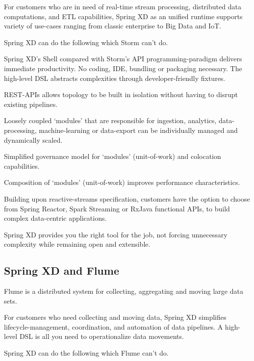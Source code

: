 For customers who are in need of real-time stream processing, distributed data computations, and ETL capabilities, Spring XD as an unified runtime supports variety of use-cases ranging from classic enterprise to Big Data and IoT. 

Spring XD can do the following which Storm can't do.

\begin{itemize*}
\item Spring XD's Shell compared with Storm's API programming-paradigm delivers immediate productivity. No coding, IDE, bundling or packaging necessary. The high-level DSL abstracts complexities through developer-friendly fixtures.
\item REST-APIs allows topology to be built in isolation without having to disrupt existing pipelines.
\item Loosely coupled `modules' that are responsible for ingestion, analytics, data-processing, machine-learning or data-export can be individually managed and dynamically scaled.
\item Simplified governance model for `modules' (unit-of-work) and colocation capabilities.
\item Composition of `modules' (unit-of-work) improves performance characteristics. 
\item Building upon reactive-streams specification, customers have the option to choose from Spring Reactor, Spark Streaming or RxJava functional APIs, to build complex data-centric applications.
\end{itemize*}

Spring XD provides you the right tool for the job, not forcing unnecessary complexity while remaining open and extensible.

\subsection{Spring XD and Flume}
Flume is a distributed system for collecting, aggregating and moving large data sets. 

For customers who need collecting and moving data, Spring XD simplifies lifecycle-management, coordination, and automation of data pipelines. A high-level DSL is all you need to operationalize data movements. 

Spring XD can do the following which Flume can't do.

